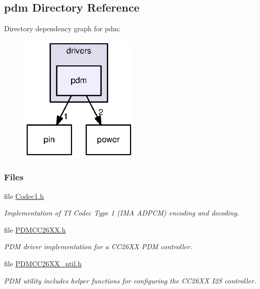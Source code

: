 \subsection{pdm Directory Reference}
\label{dir_ba8fcf1aa81afb2ab96a8a371cf6c048}
Directory dependency graph for pdm\+:
\nopagebreak
\begin{figure}[H]
\begin{center}
\leavevmode
\includegraphics[width=163pt]{dir_ba8fcf1aa81afb2ab96a8a371cf6c048_dep}
\end{center}
\end{figure}
\subsubsection*{Files}
\begin{DoxyCompactItemize}
\item 
file \hyperlink{_codec1_8h}{Codec1.\+h}
\begin{DoxyCompactList}\small\item\em Implementation of T\+I Codec Type 1 (I\+M\+A A\+D\+P\+C\+M) encoding and decoding. \end{DoxyCompactList}\item 
file \hyperlink{_p_d_m_c_c26_x_x_8h}{P\+D\+M\+C\+C26\+X\+X.\+h}
\begin{DoxyCompactList}\small\item\em P\+D\+M driver implementation for a C\+C26\+X\+X P\+D\+M controller. \end{DoxyCompactList}\item 
file \hyperlink{_p_d_m_c_c26_x_x__util_8h}{P\+D\+M\+C\+C26\+X\+X\+\_\+util.\+h}
\begin{DoxyCompactList}\small\item\em P\+D\+M utility includes helper functions for configuring the C\+C26\+X\+X I2\+S controller. \end{DoxyCompactList}\end{DoxyCompactItemize}
